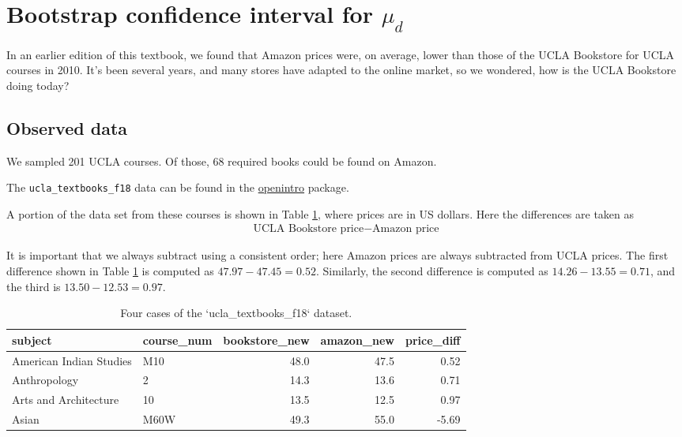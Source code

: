 \documentclass[
  10pt,
  openany]{book}
\theoremstyle{definition}
\theoremstyle{definition}
\theoremstyle{definition}
\theoremstyle{definition}
\theoremstyle{remark}
\begin{document}
\section{\texorpdfstring{Bootstrap confidence interval for \(\mu_d\)}{Bootstrap confidence interval for \textbackslash mu\_d}}\label{bootstrap-confidence-interval-for-mu_d}

In an earlier edition of this textbook,
we found that Amazon prices were, on average,
lower than those of the UCLA Bookstore for UCLA courses
in 2010.
It's been several years, and many stores have adapted
to the online market, so we wondered,
how is the UCLA Bookstore doing today?

\subsection{Observed data}\label{observed-data-8}

We sampled 201 UCLA courses.
Of those, 68
required books could be found on Amazon.

The \texttt{ucla\_textbooks\_f18} data can be found in the \href{http://openintrostat.github.io/openintro/reference/index.html}{openintro} package.

A portion of the data set from these courses
is shown in Table \ref{tab:textbooksDF},
where prices are in US dollars. Here the differences are taken as
\begin{align*}
\text{UCLA Bookstore price} - \text{Amazon price}
\end{align*}

It is important that we always subtract using
a consistent order;
here Amazon prices are always subtracted from UCLA prices.
The first difference shown in Table \ref{tab:textbooksDF}
is computed as \(47.97 - 47.45 = 0.52\).
Similarly, the second difference is computed as
\(14.26 - 13.55 = 0.71\),
and the third is \(13.50 - 12.53 = 0.97\).

\begin{table}
\centering
\caption{\label{tab:textbooksDF}Four cases of the `ucla_textbooks_f18` dataset.}
\centering
\begin{tabular}[t]{l|l|r|r|r}
\hline
subject & course\_num & bookstore\_new & amazon\_new & price\_diff\\
\hline
American Indian Studies & M10 & 48.0 & 47.5 & 0.52\\
\hline
Anthropology & 2 & 14.3 & 13.6 & 0.71\\
\hline
Arts and Architecture & 10 & 13.5 & 12.5 & 0.97\\
\hline
Asian & M60W & 49.3 & 55.0 & -5.69\\
\hline
\end{tabular}
\end{table}
\end{document}
